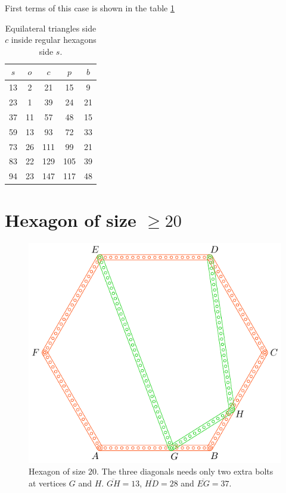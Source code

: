 \documentclass[11pt]{article}
\begin{document}
First terms of this case is shown in the table \ref{tbl:eqtriangles}
\begin{table}[H]
\begin{center}
\begin{tabular}{||c c c c c||} 
 \hline
 $s$ & $o$ & $c$ & $p$ & $b$ \\ [0.5ex] 
 \hline\hline
  13 &  2 &  21 &  15 &  9 \\ \hline
  23 &  1 &  39 &  24 & 21 \\ \hline
  37 & 11 &  57 &  48 & 15 \\ \hline
  59 & 13 &  93 &  72 & 33 \\ \hline
  73 & 26 & 111 &  99 & 21 \\ \hline
  83 & 22 & 129 & 105 & 39 \\ \hline
  94 & 23 & 147 & 117 & 48 \\ \hline
\end{tabular}
\caption{Equilateral triangles side $c$ inside regular hexagons side $s$.}
\label{tbl:eqtriangles}
\end{center}
\end{table}

\section{Hexagon of size $\ge 20$}

\begin{figure}[H]
\centering
\includegraphics[scale=1]{20/hexa-20a}
\caption{Hexagon of size $20$. The three diagonals needs only two extra bolts at vertices $G$ and $H$. $\overline{GH} = 13$, $\overline{HD} = 28$ and $\overline{EG} = 37$.}
\label{fig:20a}
\end{figure}
\end{document}
